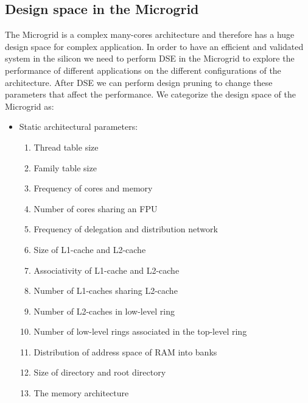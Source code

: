 \documentclass{article}
\begin{document}
\subsection{Design space in the Microgrid}

The Microgrid is a complex many-cores architecture and therefore has a huge
design space for complex application. In order to have an efficient and
validated system in the silicon we need to perform DSE in the Microgrid to
explore the performance of different applications on the different
configurations of the architecture. After DSE we can perform design pruning to
change these parameters that affect the performance. We categorize the design
space of the Microgrid as:

\begin{itemize}

\item Static architectural parameters:

\begin{enumerate}

\item Thread table size

\item Family table size

\item Frequency of cores and memory

\item Number of cores sharing an FPU

\item Frequency of delegation and distribution network

\item Size of L1-cache and L2-cache

\item Associativity of L1-cache and L2-cache

\item Number of L1-caches sharing L2-cache

\item Number of L2-caches in low-level ring

\item Number of low-level rings associated in the top-level ring

\item Distribution of address space of RAM into banks

\item Size of directory and root directory

\item The memory architecture


\end{enumerate}
\end{itemize}
\end{document}
